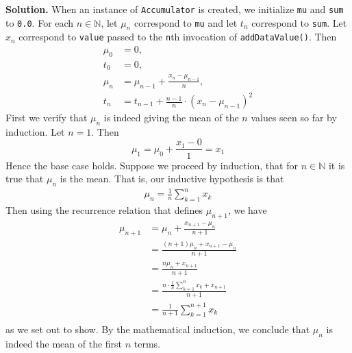 \documentclass[12pt, a4paper]{article}
\newenvironment{sol}[1][Solution]
{\par\medskip\noindent \textbf{#1.} }
{\medskip}
\begin{document}
	\begin{sol}
		When an instance of \texttt{Accumulator} is created, we initialize \texttt{mu}
		and \texttt{sum} to \texttt{0.0}. For each $n\in\mathbb{N}$, let $\mu_n$ correspond to
		\texttt{mu} and let $t_n$ correspond to \texttt{sum}. Let $x_{n}$ correspond
		to \texttt{value} passed to the \texttt{n}th invocation of \texttt{addDataValue()}.
		Then
		\begin{align*}
			\mu_0 &= 0,\\
			t_0 &= 0,\\
			\mu_{n} &= \mu_{n-1} + \frac{x_n - \mu_{n-1}}{n},\\
			t_n &= t_{n-1} + \frac{n-1}{n}\cdot (x_n-\mu_{n-1})^2
		\end{align*}
		First we verify that $\mu_n$ is indeed giving the mean of the $n$ values
		seen so far by induction. Let $n=1$. Then
		\[
		\mu_1 = \mu_0 + \frac{x_1- 0}{1} = x_1
		\]
		Hence the base case holds. Suppose we proceed by induction, that for
		$n\in\mathbb{N}$ it is true that $\mu_n$ is the mean. That is, our
		inductive hypothesis is that
		\begin{align*}
			\mu_n = \frac{1}{n}\sum_{k=1}^{n}x_k
		\end{align*}
		Then using the recurrence relation that defines $\mu_{n+1}$, we have
		\begin{align*}
			\mu_{n+1} &= \mu_n + \frac{x_{n+1}-\mu_{n}}{n+1}\\
			&=\frac{(n+1)\mu_n + x_{n+1}-\mu_n}{n+1}\\
			&=\frac{n\mu_n+x_{n+1}}{n+1}\\
			&=\frac{n\cdot \frac{1}{n}\sum_{k=1}^{n}x_k+x_{n+1}}{n+1}\\
			&=\frac{1}{n+1}\sum_{k=1}^{n+1}x_k\\
		\end{align*}
		as we set out to show. By the mathematical induction, we conclude that $\mu_n$
		is indeed the mean of the first $n$ terms.
		

\end{sol}
\end{document}

